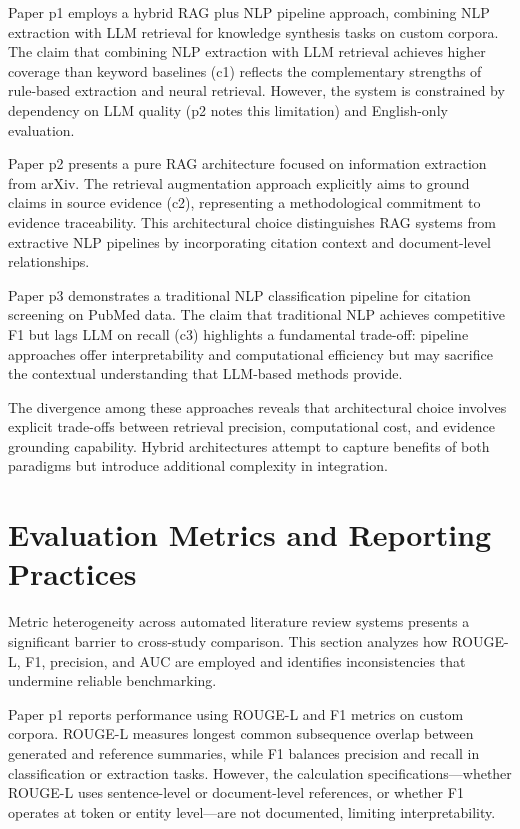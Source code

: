 \documentclass{article}
\begin{document}
Paper p1 employs a hybrid RAG plus NLP pipeline approach, combining NLP extraction with LLM retrieval for knowledge synthesis tasks on custom corpora. The claim that combining NLP extraction with LLM retrieval achieves higher coverage than keyword baselines (c1) reflects the complementary strengths of rule-based extraction and neural retrieval. However, the system is constrained by dependency on LLM quality (p2 notes this limitation) and English-only evaluation.

Paper p2 presents a pure RAG architecture focused on information extraction from arXiv. The retrieval augmentation approach explicitly aims to ground claims in source evidence (c2), representing a methodological commitment to evidence traceability. This architectural choice distinguishes RAG systems from extractive NLP pipelines by incorporating citation context and document-level relationships.

Paper p3 demonstrates a traditional NLP classification pipeline for citation screening on PubMed data. The claim that traditional NLP achieves competitive F1 but lags LLM on recall (c3) highlights a fundamental trade-off: pipeline approaches offer interpretability and computational efficiency but may sacrifice the contextual understanding that LLM-based methods provide.

The divergence among these approaches reveals that architectural choice involves explicit trade-offs between retrieval precision, computational cost, and evidence grounding capability. Hybrid architectures attempt to capture benefits of both paradigms but introduce additional complexity in integration.

\section{Evaluation Metrics and Reporting Practices}
Metric heterogeneity across automated literature review systems presents a significant barrier to cross-study comparison. This section analyzes how ROUGE-L, F1, precision, and AUC are employed and identifies inconsistencies that undermine reliable benchmarking.

Paper p1 reports performance using ROUGE-L and F1 metrics on custom corpora. ROUGE-L measures longest common subsequence overlap between generated and reference summaries, while F1 balances precision and recall in classification or extraction tasks. However, the calculation specifications—whether ROUGE-L uses sentence-level or document-level references, or whether F1 operates at token or entity level—are not documented, limiting interpretability.
\end{document}
